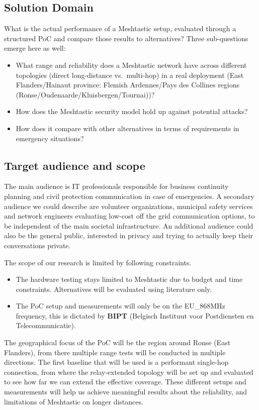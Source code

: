\subsection{Solution Domain}%
\label{subsec:solution-domain}
What is the actual performance of a Meshtastic setup, evaluated through a structured PoC and compare those results to alternatives?
Three sub-questions emerge here as well:
\begin{itemize}
  \item What range and reliability does a Meshtastic network have across different topologies (direct long-distance
  vs.\ multi-hop) in a real deployment (East Flanders/Hainaut province: Flemish Ardennes/Pays des Collines regions (Ronse/\allowbreak{}Oudenaarde/\allowbreak{}Kluisbergen/\allowbreak{}Tournai))?
  \item How does the Meshtastic security model hold up against potential attacks?
  \item How does it compare with other alternatives in terms of requirements in emergency situations?
\end{itemize}

\subsection{Target audience and scope}%
\label{subsec:target-audience-and-scope}
The main audience is IT professionals responsible for business continuity planning and civil protection communication
in case of emergencies. A secondary audience we could describe are volunteer organizations, municipal safety services and 
network engineers evaluating low-cost off the grid communication options, to be independent of the main societal infrastructure.
An additional audience could also be the general public, interested in privacy and trying to actually keep their conversations private.

The scope of our research is limited by following constraints.
\begin{itemize}
  \item The hardware testing stays limited to Meshtastic due to budget and time constraints. Alternatives will be evaluated using literature only.
  \item The PoC setup and measurements will only be on the EU\_868MHz frequency, this is dictated by \textbf{BIPT} (Belgisch Instituut voor Postdiensten en Telecommunicatie).
\end{itemize}
The geographical focus of the PoC will be the region around Ronse (East Flanders), from there multiple range tests will be
conducted in multiple directions. The first baseline that will be used is a performant single-hop connection, from where
the relay-extended topology will be set up and evaluated to see how far we can extend the effective coverage.
These different setups and measurements will help us achieve meaningful results about the reliability, and limitations of Meshtastic on longer distances.



